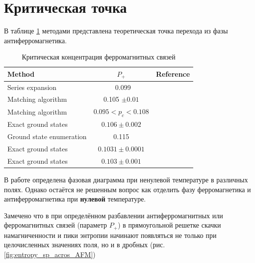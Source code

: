 \documentclass[utf8, babel, sor, jor, amsmath, amssymb, reprint]{elsarticle} %
\begin{document}
\section{Критическая точка}

В таблице \ref{tab:lit_phase} методами представлена теоретическая точка перехода из фазы антиферромагнетика.

\begin{table}[!h]
	\begin{tabular}{|l|c|l|}
		\hline
		Method                                   & $P_{+}$                                       & Reference                                           
		\\ \hline
		Series expansion 								& ~0.099                                  & \cite{PhysRevB.19.260}    \\ \hline
	     Matching algorithm                            & 
	     0.105 $\pm 0.01$                                        & \cite{H_Freund_1989} \\ \hline
		Matching algorithm                      & 
		$0.095<p_c<0.108$                                          & \cite{BENDISCH1994139}      \\ \hline
		Exact ground states                       & 
		$0.106 \pm 0.002$                               & \cite{N.Kawashima_1997}     \\ \hline
		Ground state enumeration                             & 0.115                                          & \cite{PhysRevE.58.1502} \\ \hline
    	Exact ground states        & 
		$0.1031\pm0.0001$                                          & \cite{WANG200331}   \\ \hline
		Exact ground states   & $0.103\pm0.001$                                       & \cite{amoruso2004domain} 
		    \\ \hline
			
	\end{tabular}
	\label{tab:lit_phase}
	\caption{Критическая концентрация ферромагнитных связей}
\end{table}

В работе \cite{trukhin4855337thermodynamic} определена фазовая диаграмма при ненулевой температуре в различных полях. Однако остаётся не решенным вопрос как отделить фазу ферромагнетика и антиферромагнетика при \textbf{нулевой} температуре.

Замечено что в при определённом разбавлении антиферромагнитных или ферромагнитных связей (параметр $P_+$) в прямоугольной решетке скачки намагниченности и пики энтропии начинают появляться не только при целочисленных значениях поля, но и в дробных (рис. \ref{fig:entropy_sp_acros_AFM})
\end{document}
